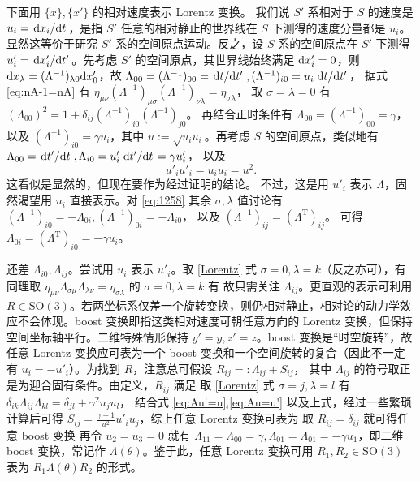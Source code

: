 下面用 $\{x\},\{x'\}$ 的相对速度表示 Lorentz 变换。
我们说 $S'$ 系相对于 $S$ 的速度是 $u_i=\dv*{x_i}{t}$，是指 $S'$ 任意的相对静止的世界线在 $S$ 下测得的速度分量都是 $u_i$。显然这等价于研究 $S'$ 系的空间原点运动。反之，设 $S$ 系的空间原点在 $S'$ 下测得 $u'_i=\dv*{x'_i}{t'}$。先考虑 $S'$ 的空间原点，其世界线始终满足 $\dd x'_i=0$，则 $\dd x_\lambda=(\Lambda^{-1})_{\lambda 0}\dd x'_0$，故 $\Lambda_{00}=(\Lambda^{-1})_{00}=\dv*{t}{t'},(\Lambda^{-1})_{i0}=u_i\dv*{t}{t'}$，
    据式 \eqref{eq:nA-1=nA} 有 $\eta_{\mu\nu}(\Lambda^{-1})_{\mu\sigma}(\Lambda^{-1})_{\nu\lambda}={\eta}_{\sigma\lambda}$，    取 $\sigma=\lambda=0$ 有 $(\Lambda_{00})^2=1+\delta_{ij}(\Lambda^{-1})_{i0}(\Lambda^{-1})_{j0}$。
    再结合正时条件有 $\Lambda_{00}=(\Lambda^{-1})_{00}=\gamma$，以及 $(\Lambda^{-1})_{i0}=\gamma u_i$，其中 $u:=\sqrt{u_i u_i}$。再考虑 $S$ 的空间原点，类似地有 $\Lambda_{00}=\dv*{t'}{t},\Lambda_{i0}=u'_i \dv*{t'}{t}=\gamma u'_i$，
    以及
    \[u'_iu'_i=u_i u_i=u^2.\]
    这看似是显然的，但现在要作为经过证明的结论。
    不过，这是用 $u'_i$ 表示 $\Lambda$，固然渴望用 $u_i$ 直接表示。对 \eqref{eq:1258} 其余 $\sigma,\lambda$ 值讨论有 $(\Lambda^{-1})_{i0}=-\Lambda_{0i},(\Lambda^{-1})_{0i} =-\Lambda_{i0}$，
    以及 $(\Lambda^{-1})_{ij}=(\Lambda^\mathrm{T})_{ij}$。
    可得 $\Lambda_{0i}=(\Lambda^\mathrm{T})_{i0}=-\gamma u_i$。

    还差 $\Lambda_{i0},\Lambda_{ij}$。尝试用 $u_i$ 表示 $u'_i$。取 \eqref{Lorentz} 式 $\sigma=0,\lambda=k$（反之亦可），有
    同理取 $\eta_{\mu\nu}\Lambda_{\sigma\mu}\Lambda_{\lambda\nu}={\eta}_{\sigma\lambda}$ 的 $\sigma=0,\lambda=k$ 有
    故只需关注 $\Lambda_{ij}$。更直观的表示可利用 $R\in\mathrm{SO}(3)$。若两坐标系仅差一个旋转变换，则仍相对静止，相对论的动力学效应不会体现。boost 变换即指这类相对速度可朝任意方向的 Lorentz 变换，但保持空间坐标轴平行。二维特殊情形保持 $y'=y,z'=z$。boost 变换是“时空旋转”，故任意 Lorentz 变换应可表为一个 boost 变换和一个空间旋转的复合（因此不一定有 $u_i=-u'_i$）。为找到 $R$，注意总可假设
    $R_{ij}=:\Lambda_{ij}+S_{ij}$，
    其中 $\Lambda_{ij}$ 的符号取正是为迎合固有条件。由定义，$R_{ij}$ 满足
    取 \eqref{Lorentz} 式 $\sigma=j,\lambda=l$ 有 $\delta_{ik}\Lambda_{ij}\Lambda_{kl}=\delta_{jl}+ \gamma^2 u_j u_l$，
    结合式 \eqref{eq:Au'=u},\eqref{eq:Au=u'} 以及上式，经过一些繁琐计算后可得 $S_{ij}=\frac{\gamma-1}{u^2}u'_i u_j$，综上任意 Lorentz 变换可表为
    取 $R_{ij}=\delta_{ij}$ 就可得任意 boost 变换
再令 $u_2=u_3=0$ 就有 $\Lambda_{11}=\Lambda_{00}=\gamma, \Lambda_{01}=\Lambda_{01}=-\gamma u_1$，即二维 boost 变换，常记作 $\Lambda(\theta)$。鉴于此，任意 Lorentz 变换可用 $R_{1},R_{2}\in\mathrm{SO}(3)$ 表为 $R_{1} \Lambda(\theta) R_{2}$ 的形式。

